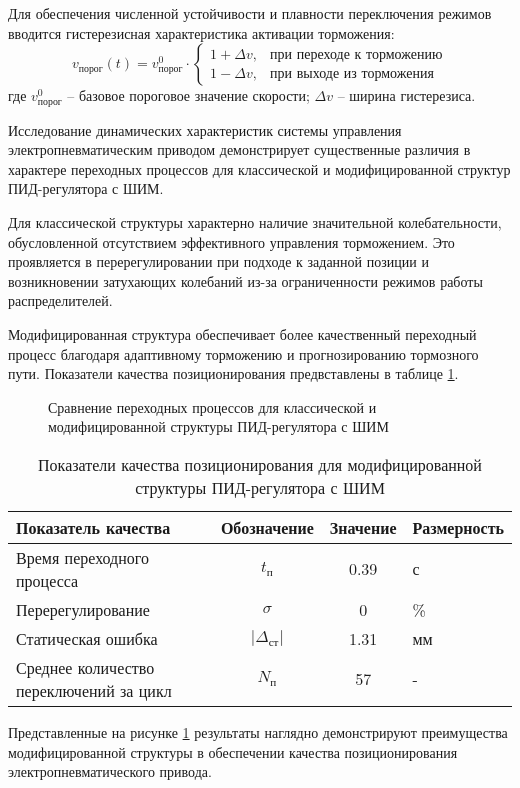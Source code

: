 Для обеспечения численной устойчивости и плавности переключения режимов вводится гистерезисная характеристика активации торможения:
\begin{equation}\label{eq:hysteresis}
	v_{\text{порог}}(t) = v_{\text{порог}}^0 \cdot \begin{cases}
		1 + \Delta v, & \text{при переходе к торможению} \\
		1 - \Delta v, & \text{при выходе из торможения}
	\end{cases}
\end{equation}
где $v_{\text{порог}}^0$ -- базовое пороговое значение скорости;
$\Delta v$ -- ширина гистерезиса.

Исследование динамических характеристик системы управления электропневматическим приводом демонстрирует существенные различия
в характере переходных процессов для классической и модифицированной структур ПИД-регулятора с ШИМ.

Для классической структуры характерно наличие значительной колебательности, обусловленной отсутствием эффективного
управления торможением. Это проявляется в перерегулировании при подходе к заданной позиции и возникновении
затухающих колебаний из-за ограниченности режимов работы распределителей.


Модифицированная структура обеспечивает более качественный переходный процесс благодаря
адаптивному торможению и прогнозированию тормозного пути. Показатели качества позиционирования
предвставлены в таблице \ref{tab:system_params_pid}.

\begin{figure}[ht!]
	\caption{Сравнение переходных процессов для классической и модифицированной структуры ПИД-регулятора с ШИМ}
	\label{fig:ch3:transient_comparison}
\end{figure}

\begin{table}[h!]
	\centering
	\caption{Показатели качества позиционирования для модифицированной структуры ПИД-регулятора с ШИМ}
	\small
	\begin{tabular}{lccl}
		\textbf{Показатель качества}            & \textbf{Обозначение}   & \textbf{Значение} & \textbf{Размерность} \\
		\midrule
		Время переходного процесса              & $t_\text{п}$                  & \num{0.39}        & с                    \\
		Перерегулирование                       & $\sigma$               & \num{0}           & \%                   \\
		Статическая ошибка                      & $|\Delta_{\text{ст}}|$ & \num{1.31}        & мм                   \\
		Среднее количество переключений за цикл & $N_\text{п}$           & 57                & -                    \\
		\midrule
	\end{tabular}
	\label{tab:system_params_pid}
\end{table}

Представленные на рисунке \ref{fig:ch3:transient_comparison} результаты наглядно демонстрируют
преимущества модифицированной структуры в обеспечении качества позиционирования электропневматического привода.